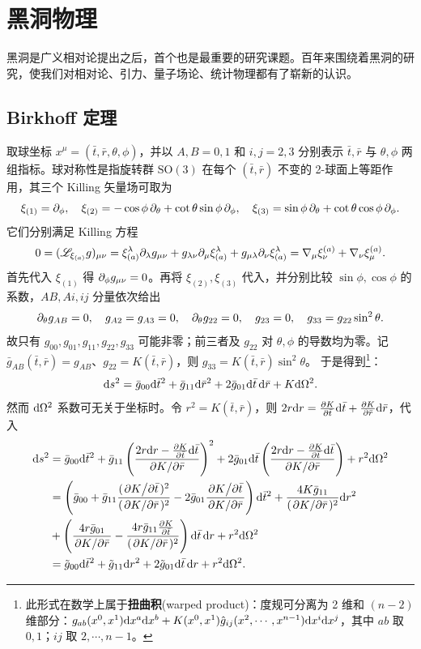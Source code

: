 \chapter{黑洞物理}\label{chpt:BH}

黑洞是广义相对论提出之后，首个也是最重要的研究课题。百年来围绕着黑洞的研究，使我们对相对论、引力、量子场论、统计物理都有了崭新的认识。

\section{Birkhoff 定理}

取球坐标 $x^\mu=(\bar t,\bar r,\theta,\phi)$，并以 $A,B=0,1$ 和 $i,j=2,3$ 分别表示 $\bar t,\bar r$ 与 $\theta,\phi$ 两组指标。球对称性是指旋转群 $\mathrm{SO}(3)$ 在每个 $(\bar t,\bar r)$ 不变的 2-球面上等距作用，其三个 Killing 矢量场可取为
\[
    \xi_{(1)}=\partial_\phi,\quad
    \xi_{(2)}=-\cos\phi\,\partial_\theta+\cot\theta\sin\phi\,\partial_\phi,\quad
    \xi_{(3)}=\sin\phi\,\partial_\theta+\cot\theta\cos\phi\,\partial_\phi.
\]
它们分别满足 Killing 方程
\[
    0=(\mathscr{L}_{\xi_{(a)}}g)_{\mu\nu}
    =\xi_{(a)}^\lambda\partial_\lambda g_{\mu\nu}
    +g_{\lambda\nu}\partial_\mu\xi_{(a)}^\lambda
    +g_{\mu\lambda}\partial_\nu\xi_{(a)}^\lambda
    =\nabla_\mu\xi^{(a)}_\nu+\nabla_\nu\xi^{(a)}_\mu.
\]
首先代入 $\xi_{(1)}$ 得 $\partial_\phi g_{\mu\nu}=0$。再将 $\xi_{(2)},\xi_{(3)}$ 代入，并分别比较 $\sin\phi,\cos\phi$ 的系数，$AB,Ai,ij$ 分量依次给出
\[
    \partial_\theta g_{AB}=0,\quad
    g_{A2}=g_{A3}=0,\quad
    \partial_\theta g_{22}=0,\quad
    g_{23}=0,\quad
    g_{33}=g_{22}\sin^2\theta.
\]
故只有 $g_{00},g_{01},g_{11},g_{22},g_{33}$ 可能非零；前三者及 $g_{22}$ 对 $\theta,\phi$ 的导数均为零。记 $\bar g_{AB}(\bar t,\bar r)=g_{AB}$、$g_{22}=K(\bar t,\bar r)$，则 $g_{33}=K(\bar t,\bar r)\sin^2\theta$。
于是得到\footnote{此形式在数学上属于\textbf{扭曲积}(warped product)：度规可分离为 2 维和 $(n-2)$ 维部分：$g_{ab}(x^0,x^1)\dd x^a\dd x^b+K(x^0,x^1)\hat g_{ij}(x^2,\cdots,x^{n-1})\dd x^i\dd x^j$，其中 $ab$ 取 $0,1$；$ij$ 取 $2,\cdots,n-1$。}：
\[\dd s^2=\bar g_{00}\dd\bar t^2+\bar g_{11}\dd\bar r^2+2\bar g_{01}\dd\bar t\,\dd\bar r+K\dd\Omega^2.\]
然而 $\dd\Omega^2$ 系数可无关于坐标时。令 $r^2=K(\bar t,\bar r)$，则 $2r\dd r=\pdv{K}{\bar t}\dd\bar t+\pdv{K}{\bar r}\dd\bar r$，代入
\begin{align*}
    \dd s^2&=\bar g_{00}\dd\bar t^2+\bar g_{11}\left(\frac{2r\dd r-\pdv{K}{\bar t}\dd\bar t}{\pdv*{K}{\bar r}}\right)^2+2\bar g_{01}\dd\bar t\left(\frac{2r\dd r-\pdv{K}{\bar t}\dd\bar t}{\pdv*{K}{\bar r}}\right)+r^2\dd\Omega^2\\
    &=\left(\bar g_{00}+\bar g_{11}\frac{(\pdv*{K}{\bar t})^2}{(\pdv*{K}{\bar r})^2}-2\bar g_{01}\frac{\pdv*{K}{\bar t}}{\pdv*{K}{\bar r}}\right)\dd\bar t^2+\frac{4K\bar g_{11}}{(\pdv*{K}{\bar r})^2}\dd r^2\\
    &+\left(\frac{4r\bar g_{01}}{\pdv*{K}{\bar r}}-\frac{4r\bar g_{11}\pdv{K}{\bar t}}{(\pdv*{K}{\bar r})^2}\right)\dd\bar t\,\dd r+r^2\dd\Omega^2\\
    &=\tilde g_{00}\dd\bar t^2+\tilde g_{11}\dd r^2+2\tilde g_{01}\dd\bar t\,\dd r+r^2\dd\Omega^2.
\end{align*}
